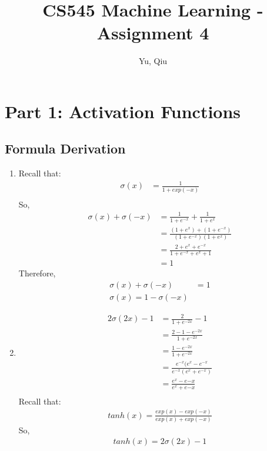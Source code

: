 \documentclass{article}
\begin{document}
\title{CS545 Machine Learning - Assignment 4}
\author{Yu, Qiu}
\maketitle

\noindent\hrulefill
\vspace{-5mm} %
\tableofcontents
\noindent\hrulefill

\section{Part 1: Activation Functions}
\subsection{Formula Derivation}
\begin{enumerate}
	\item Recall that:
	\begin{align}
	\sigma(x)& = \frac{1}{1+exp(-x)}\\
	\end{align}
	So, \\
	\begin{align}
	\sigma(x)+\sigma(-x) &=\frac{1}{1+e^{-x}}+\frac{1}{1+e^{x}}\\
	&=\frac{(1+e^{x})+(1+e^{-x})}{(1+e^{-x})(1+e^{x})}\\
	&=\frac{2+e^{x}+e^{-x}}{1+e^{-x}+e^{x}+1}\\
	&=1
	\end{align}
	Therefore,
	\begin{align}
	\sigma(x) + \sigma(-x) &= 1\\
	\sigma(x) = 1 - \sigma(-x)
	\end{align}
	\item 
	\begin{align}
	2\sigma(2x)-1 &= \frac{2}{1+e^{-2x}}-1\\
	&=\frac{2-1-e^{-2x}}{1+e^{-2x}}\\
	&=\frac{1-e^{-2x}}{1+e^{-2x}}\\
	&=\frac{e^{-x}(e^{x}-e^{-x}}{e^{-x}(e^{x}+e^{-x})}\\
	&=\frac{e^{x}-e{-x}}{e^{x}+e{-x}}\\
	\end{align}
	Recall that:\\
	\begin{align}
	tanh(x) = \frac{exp(x)-exp(-x)}{exp(x)+exp(-x)}
	\end{align}
	So,
	\begin{align}
	tanh(x) = 2\sigma(2x)-1
	\end{align}
	\end{enumerate}
\end{document}
